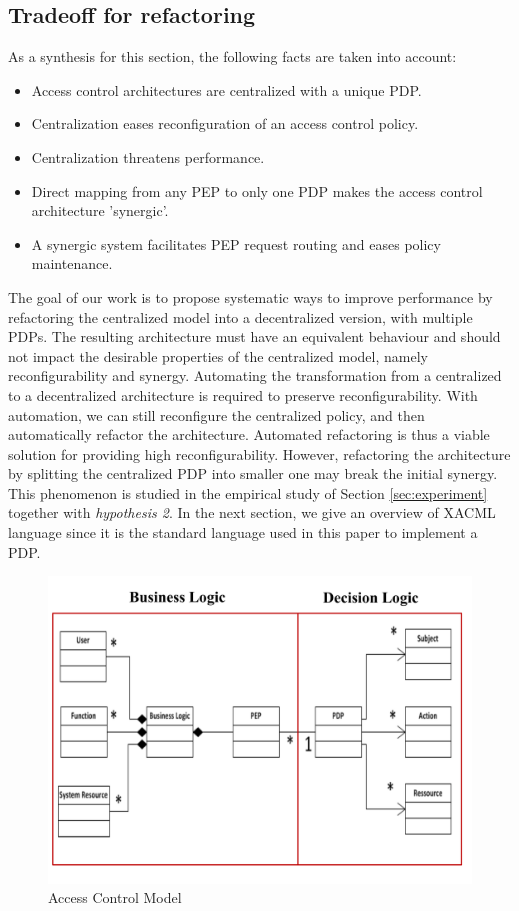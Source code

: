 \subsection{Tradeoff for refactoring}
As a synthesis for this section, the following facts are taken into account:
\begin{itemize}
\item Access control architectures are centralized with a unique PDP.
\item Centralization eases reconfiguration of an access control policy.
\item Centralization threatens performance.
\item Direct mapping from any PEP to only one PDP makes the access control architecture 'synergic'.
\item A synergic system facilitates PEP request routing and eases policy maintenance.
\end{itemize}
The goal of our work is to propose systematic ways to improve performance by refactoring the centralized model into a decentralized version, with multiple PDPs. The resulting
 architecture must have an equivalent behaviour and should not impact the desirable properties of the centralized model, namely reconfigurability and synergy. 
Automating the transformation from a centralized to a decentralized architecture is required to preserve reconfigurability. With automation, we can still reconfigure the centralized policy, 
and then automatically refactor the architecture. Automated refactoring is thus a viable solution for providing high reconfigurability.  
However, refactoring the architecture by splitting the centralized PDP into smaller one may break the initial synergy. This phenomenon is studied in the empirical study of Section 
\ref{sec:experiment} together with \textit{hypothesis 2}. In the next section, we give an overview of XACML language since it is the standard language used in this paper to implement a PDP.
\begin{figure}[!h]
\begin{center}
\includegraphics[scale=0.34]{model}
\caption{Access Control Model}
\label{model}
\end{center}
\end{figure}
